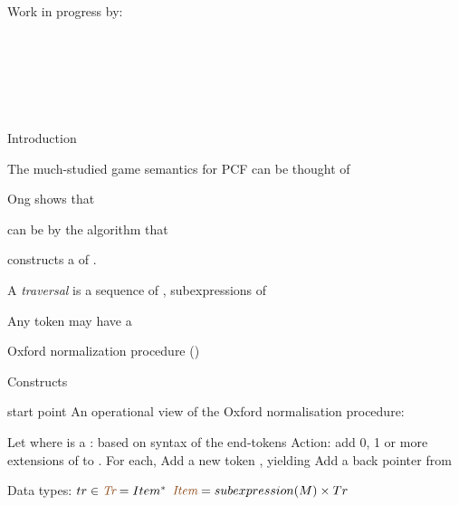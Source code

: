 \documentclass[12pt,fleqn,landscape]{article}
\begin{document}
\begin{center}\LARGE

Work in progress by:
\vair

\bi
\item 
 \\\hair
{}\\
\vair\vair

\item 
 \\\hair
{}\\
\ei
\end{center}


\begin{slide}{Introduction}

The much-studied game semantics for PCF can be thought of


\bc
Ong \cite{ong2015} shows that
\ec

 can be  
  by the algorithm that 

  constructs a  of .
\vair\vair

A \textit{traversal} is a sequence of
\bi
\ii {}, subexpressions of 
  
  \hfill {}
\vair
\ii Any token may have a 
\vair\vair

\ii Oxford normalization procedure ()
\vair\vair

  \bi
  \ii Constructs 
  \ei

\vair\vair
\ei

\end{slide}


\begin{slide}{start point}
\bi
\ii An operational view of the Oxford normalisation procedure: 
\vair

  \bc{}\ec

  \bi
  \ii Let  \hfill where  is a 
  \vair
  \ii {}:
    \bc based on syntax of the end-tokens  \ec
  \vair
  \ii Action: add 0, 1 or more extensions of  to . For each,
  \vair
      \bi
      \ii Add a new token , yielding 
      \ii Add a back pointer from 
      \ei
  \ei
\vair

\ii Data types:
  \bi
  \ii $tr \in \lam{Tr} = Item^{*}$
  \ii $\lam{Item} = subexpression(M) \times Tr$
  \ei
\ei

\end{slide}
\end{document}
